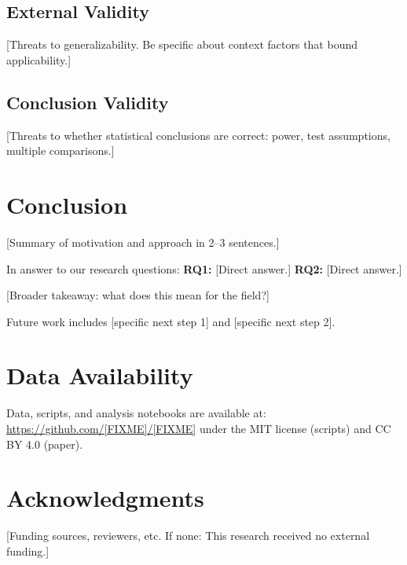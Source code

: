 \documentclass[11pt,a4paper]{article}
\newif\ifanonymized
\begin{document}
\subsection{External Validity}

[Threats to generalizability. Be specific about context factors that bound applicability.]

\subsection{Conclusion Validity}

[Threats to whether statistical conclusions are correct: power, test assumptions, multiple comparisons.]


\section{Conclusion}
\label{sec:conclusion}

[Summary of motivation and approach in 2–3 sentences.]

In answer to our research questions:
\textbf{RQ1:} [Direct answer.]
\textbf{RQ2:} [Direct answer.]

[Broader takeaway: what does this mean for the field?]

Future work includes [specific next step 1] and [specific next step 2].







\section*{Data Availability}
\ifanonymized
  Data and scripts will be made publicly available upon acceptance.
\else
  Data, scripts, and analysis notebooks are available at: \url{https://github.com/[FIXME]/[FIXME]}
  under the MIT license (scripts) and CC BY 4.0 (paper).
\fi


\ifanonymized
\else
  \section*{Acknowledgments}
  [Funding sources, reviewers, etc. If none: This research received no external funding.]
\fi
\end{document}
